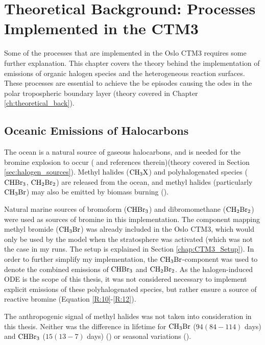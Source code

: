 \setcounter{chapter}{2} 
\chapter{Theoretical Background: Processes Implemented in the CTM3}\label{Chap:CTM3theory_ocean_hetReact}

Some of the processes that are implemented in the Oslo CTM3 requires some further explanation. This chapter covers the theory behind the implementation of emissions of organic halogen species and the heterogeneous reaction surfaces. These processes are essential to achieve the \acrfull{be} episodes causing the \acrfull{ode}s in the polar tropospheric boundary layer (theory covered in Chapter \ref{ch:theoretical_back}).

\section{Oceanic Emissions of Halocarbons}\label{sec:oceanic_emissions}


The ocean is a natural source of gaseous halocarbons, and is needed for the bromine explosion to occur (\cite{Schmidt} and references therein)(theory covered in Section \ref{sec:halogen_sources}). Methyl halides ($\mathrm{CH_3X}$) and polyhalogenated species ($\mathrm{CHBr_3}$, $\mathrm{CH_2Br_2}$) are released from the ocean, and methyl halides (particularly $\mathrm{CH_3Br}$) may also be emitted by biomass burning (\cite{SeinfeldSpyros}). 

\medskip

Natural marine sources of bromoform ($\mathrm{CHBr_3}$) and dibromomethane ($\mathrm{CH_2Br_2}$) were used as sources of bromine in this implementation. The component mapping methyl bromide ($\mathrm{CH_3Br}$) was already included in the Oslo CTM3, which would only be used by the model when the stratosphere was activated (which was not the case in my runs. The setup is explained in Section \ref{chap:CTM3_Setup}). In order to further simplify my implementation, the $\mathrm{CH_3Br}$-component was used to denote the combined emissions of $\mathrm{CHBr_3}$ and $\mathrm{CH_2Br_2}$. As the halogen-induced ODE is the scope of this thesis, it was not considered necessary to implement explicit emissions of these polyhalogenated species, but rather ensure a source of reactive bromine (Equation \ref{R:10}-\ref{R:12}).


\medskip

The anthropogenic signal of methyl halides was not taken into consideration in this thesis. Neither was the difference in lifetime for $\mathrm{CH_3Br}$ ($94 (84-114)$ days) and $\mathrm{CHBr_3}$ ($15 (13-7)$ days) (\cite{Hossaini2016_chlorine}) or seasonal variations (\cite{Liang2010}). 


